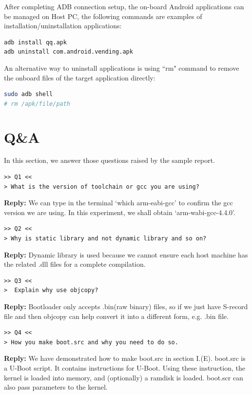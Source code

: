 \documentclass[12pt,journal,draftclsnofoot,onecolumn]{IEEEtran}
\begin{document}
After completing ADB connection setup, the on-board Android applications can be managed on Host PC, the following commands are examples of installation/uninstallation applications:
\begin{lstlisting}[language={bash}]
adb install qq.apk
adb uninstall com.android.vending.apk
\end{lstlisting}
An alternative way to uninstall applications is using ``rm" command to remove the onboard files of the target application directly:
\begin{lstlisting}[language={bash}]
sudo adb shell
# rm /apk/file/path
\end{lstlisting}

\section{Q\&A}\label{QA}
In this section, we answer those questions raised by the sample report.

\begin{verbatim}
>> Q1 <<
> What is the version of toolchain or gcc you are using?
\end{verbatim}
\textbf{Reply:} We can type in the terminal `which arm-eabi-gcc' to confirm the gcc version we are 
using. In this experiment, we shall obtain `arm-wabi-gcc-4.4.0'.

\begin{verbatim}
>> Q2 <<
> Why is static library and not dynamic library and so on?
\end{verbatim}
\textbf{Reply:} Dynamic library is used because we cannot ensure each host machine has 
the related .dll files for a complete compilation. 

\begin{verbatim}
>> Q3 <<
>  Explain why use objcopy?
\end{verbatim}
\textbf{Reply:} Bootloader only accepts .bin(raw binary) files, so if we just have S-record file and then 
objcopy can help convert it into a different form, e.g. .bin file.

\begin{verbatim}
>> Q4 <<
> How you make boot.src and why you need to do so.
\end{verbatim}
\textbf{Reply:} We have demonstrated how to make boot.src in section I.(E). 
boot.src is a U-Boot script. It contains instructions for U-Boot. Using these instruction, the kernel is loaded into memory, and (optionally) a ramdisk is loaded. boot.scr can also pass parameters to the kernel.
\end{document}
